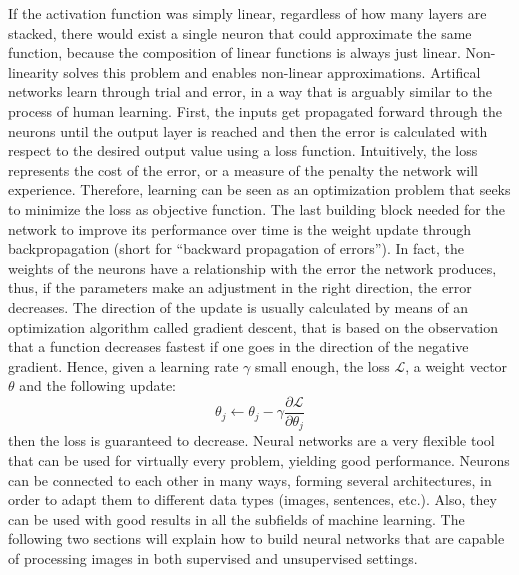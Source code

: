 \bigbreak
\noindent If the activation function was simply linear, regardless of how many layers are stacked, there would exist a single neuron that could approximate the same function, because the composition of linear functions is always just linear. Non-linearity solves this problem and enables non-linear approximations.
\bigbreak
\noindent Artifical networks learn through trial and error, in a way that is arguably similar to the process of human learning. First, the inputs get propagated forward through the neurons until the output layer is reached and then the error is calculated with respect to the desired output value using a loss function. Intuitively, the loss represents the cost of the error, or a measure of the penalty the network will experience. Therefore, learning can be seen as an optimization problem that seeks to minimize the loss as objective function.
\bigbreak
\noindent The last building block needed for the network to improve its performance over time is the weight update through backpropagation (short for ``backward propagation of errors''). In fact, the weights of the neurons have a relationship with the error the network produces, thus, if the parameters make an adjustment in the right direction, the error decreases. The direction of the update is usually calculated by means of an optimization algorithm called gradient descent, that is based on the observation that a function decreases fastest if one goes in the direction of the negative gradient. Hence, given a learning rate $\gamma$ small enough, the loss $\mathcal{L}$, a weight vector $\theta$ and the following update:
\begin{equation}
  \theta_j \leftarrow \theta_j - \gamma\frac{\partial \mathcal{L}}{\partial \theta_j}
\end{equation}
then the loss is guaranteed to decrease.
\bigbreak
\noindent Neural networks are a very flexible tool that can be used for virtually every problem, yielding good performance. Neurons can be connected to each other in many ways, forming several architectures, in order to adapt them to different data types (images, sentences, etc.). Also, they can be used with good results in all the subfields of machine learning. The following two sections will explain how to build neural networks that are capable of processing images in both supervised and unsupervised settings.


